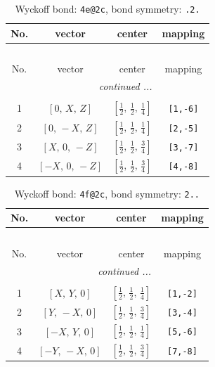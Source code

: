 \documentclass[fleqn,8pt]{jsarticle}
\begin{document}
\renewcommand{\arraystretch}{1.2}
\begin{longtable}{cccc}
\caption{Wyckoff bond: {\tt 4e@2c}, bond symmetry: {\tt .2.}}
 \\
 \hline \hline
No. & vector & center & mapping \\ \hline \endfirsthead

\multicolumn{3}{l}{\tablename\ \thetable{}} \\
 \hline \hline
No. & vector & center & mapping \\ \hline \endhead

 \hline \hline
\multicolumn{3}{r}{\footnotesize\it continued ...} \\ \endfoot

 \hline \hline
\multicolumn{3}{r}{} \\ \endlastfoot

1 & $\left[ 0,\, X,\, Z \right]$ & $\left[ \frac{1}{2},\, \frac{1}{2},\, \frac{1}{4} \right]$ & {\tt [1,-6]} \\ \hline
2 & $\left[ 0,\, - X,\, Z \right]$ & $\left[ \frac{1}{2},\, \frac{1}{2},\, \frac{1}{4} \right]$ & {\tt [2,-5]} \\ \hline
3 & $\left[ X,\, 0,\, - Z \right]$ & $\left[ \frac{1}{2},\, \frac{1}{2},\, \frac{3}{4} \right]$ & {\tt [3,-7]} \\ \hline
4 & $\left[ - X,\, 0,\, - Z \right]$ & $\left[ \frac{1}{2},\, \frac{1}{2},\, \frac{3}{4} \right]$ & {\tt [4,-8]} \\
\end{longtable}
\renewcommand{\arraystretch}{1.2}
\begin{longtable}{cccc}
\caption{Wyckoff bond: {\tt 4f@2c}, bond symmetry: {\tt 2..}}
 \\
 \hline \hline
No. & vector & center & mapping \\ \hline \endfirsthead

\multicolumn{3}{l}{\tablename\ \thetable{}} \\
 \hline \hline
No. & vector & center & mapping \\ \hline \endhead

 \hline \hline
\multicolumn{3}{r}{\footnotesize\it continued ...} \\ \endfoot

 \hline \hline
\multicolumn{3}{r}{} \\ \endlastfoot

1 & $\left[ X,\, Y,\, 0 \right]$ & $\left[ \frac{1}{2},\, \frac{1}{2},\, \frac{1}{4} \right]$ & {\tt [1,-2]} \\ \hline
2 & $\left[ Y,\, - X,\, 0 \right]$ & $\left[ \frac{1}{2},\, \frac{1}{2},\, \frac{3}{4} \right]$ & {\tt [3,-4]} \\ \hline
3 & $\left[ - X,\, Y,\, 0 \right]$ & $\left[ \frac{1}{2},\, \frac{1}{2},\, \frac{1}{4} \right]$ & {\tt [5,-6]} \\ \hline
4 & $\left[ - Y,\, - X,\, 0 \right]$ & $\left[ \frac{1}{2},\, \frac{1}{2},\, \frac{3}{4} \right]$ & {\tt [7,-8]} \\
\end{longtable}
\end{document}
